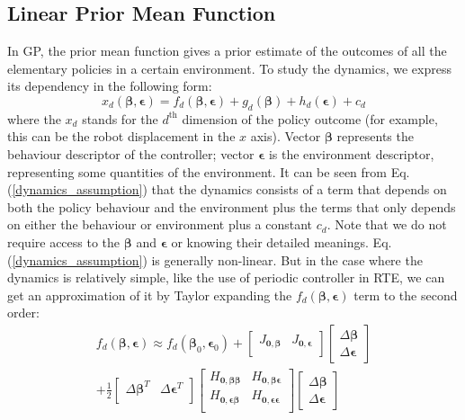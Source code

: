 \documentclass[journal]{IEEEtran}
\begin{document}
\subsection{Linear Prior Mean Function}
In GP, the prior mean function gives a prior estimate of the outcomes of all the elementary policies in a certain environment.
To study the dynamics, we express its dependency in the following form:
\begin{equation}
x_d(\bm{\beta}, \bm{\epsilon}) = f_d(\bm{\beta}, \bm{\epsilon}) 
+ g_d(\bm{\beta}) 
+ h_d(\bm{\epsilon}) + c_d 
\label{dynamics_assumption}
\end{equation}
where the $x_d$ stands for the $d^{\text{th}}$ dimension of the policy outcome (for example, this can be the robot displacement in the $x$ axis). Vector $\bm{\beta}$ represents the behaviour descriptor of the controller; vector $\bm{\epsilon}$ is the environment descriptor, representing some quantities of the environment. 
It can be seen from Eq. (\ref{dynamics_assumption}) that the dynamics consists of a term that depends on both the policy behaviour and the environment plus the terms that only depends on either the behaviour or environment plus a constant $c_d$.
Note that we do not require access to the $\bm{\beta}$ and $\bm{\epsilon}$ or knowing their detailed meanings.
Eq. (\ref{dynamics_assumption}) is generally non-linear. But in the case where the dynamics is relatively simple, like the use of periodic controller in RTE, we can get an approximation of it by Taylor expanding the $f_d(\bm{\beta}, \bm{\epsilon})$ term to the second order:
\begin{equation}
\begin{gathered}
f_d(\bm{\beta}, \bm{\epsilon}) \approx
f_d(\bm{\beta}_0, \bm{\epsilon}_0) + 
\begin{bmatrix}
J_{\bm{0, \beta}} & J_{\bm{0, \epsilon}} \\
\end{bmatrix}
%
\begin{bmatrix}
\Delta \bm{\beta} \\
\Delta \bm{\epsilon}
\end{bmatrix}
%
\\
%
+ \frac{1}{2}
\begin{bmatrix}
\Delta \bm{\beta}^T & \Delta \bm{\epsilon}^T \\
\end{bmatrix}
%
\begin{bmatrix}
H_{\bm{0, \beta \beta}} & H_{\bm{0}, \bm{\beta \epsilon}} \\
H_{\bm{0, \epsilon \beta}} & H_{\bm{0, \epsilon \epsilon}} \\
\end{bmatrix}
%
\begin{bmatrix}
\Delta \bm{\beta} \\
\Delta \bm{\epsilon}
\end{bmatrix}
\end{gathered}
\label{Taylor_expansion}
\end{equation}
\end{document}
